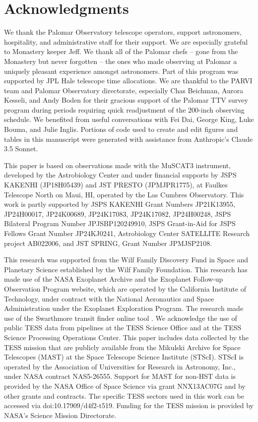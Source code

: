 \documentclass[twocolumn]{aastex631}
\begin{document}
\section{Acknowledgments}

We thank the Palomar Observatory telescope operators, support astronomers, hospitality, and administrative staff for their support. We are especially grateful to Monastery keeper Jeff. We thank all of the Palomar chefs -- gone from the Monastery but never forgotten -- the ones who made observing at Palomar a uniquely pleasant experience amongst astronomers. Part of this program was supported by JPL Hale telescope time allocations. We are thankful to the PARVI team and Palomar Observatory directorate, especially Chas Beichman, Aurora Kesseli, and Andy Boden for their gracious support of the Palomar TTV survey program during periods requiring quick readjustment of the 200-inch observing schedule. We benefited from useful conversations with Fei Dai, George King, Luke Bouma, and Julie Inglis. Portions of code used to create and edit figures and tables in this manuscript were generated with assistance from Anthropic's Claude 3.5 Sonnet.

This paper is based on observations made with the MuSCAT3 instrument, developed by the Astrobiology Center and under financial supports by JSPS KAKENHI (JP18H05439) and JST PRESTO (JPMJPR1775), at Faulkes Telescope North on Maui, HI, operated by the Las Cumbres Observatory. This work is partly supported by JSPS KAKENHI Grant Numbers JP21K13955, JP24H00017, JP24K00689, JP24K17083, JP24K17082, JP24H00248, JSPS Bilateral Program Number JPJSBP120249910, JSPS Grant-in-Aid for JSPS Fellows Grant Number JP24KJ0241, Astrobiology Center SATELLITE Research project AB022006, and JST SPRING, Grant Number JPMJSP2108.

This research was supported from the Wilf Family Discovery Fund in Space and Planetary Science established by the Wilf Family Foundation.  This research has made use of the NASA Exoplanet Archive and the Exoplanet Follow-up Observation Program website, which are operated by the California Institute of Technology, under contract with the National Aeronautics and Space Administration under the Exoplanet Exploration Program. The research made use of the Swarthmore transit finder online tool \citep{SwarthmoreTTF}. We acknowledge the use of public TESS data from pipelines
at the TESS Science Office and at the TESS Science Processing
Operations Center. This paper includes data collected by the
TESS mission that are publicly available from the Mikulski
Archive for Space Telescopes (MAST) at the Space Telescope Science Institute (STScI). STScI is operated by the Association of
Universities for Research in Astronomy, Inc., under NASA contract NAS5-26555. Support for MAST
for non-HST data is provided by the NASA Office of
Space Science via grant NNX13AC07G and by other
grants and contracts. The specific TESS sectors used in this work can be accessed
via doi:10.17909/d4f2-t519. Funding for the TESS mission
is provided by NASA’s Science Mission Directorate.
\end{document}
